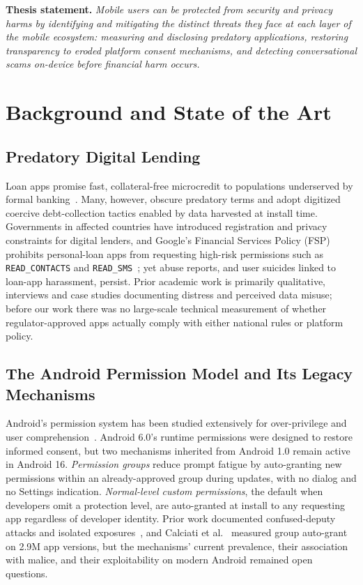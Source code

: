 \documentclass[letterpaper,11pt]{article}
\begin{document}
\textbf{Thesis statement.} \emph{Mobile users can be protected from
security and privacy harms by identifying and mitigating the distinct
threats they face at each layer of the mobile ecosystem: measuring and
disclosing predatory applications, restoring transparency to eroded
platform consent mechanisms, and detecting conversational scams
on-device before financial harm occurs.}

\section{Background and State of the Art}
\label{sec:background}

\subsection{Predatory Digital Lending}
Loan apps promise fast, collateral-free microcredit to populations
underserved by formal banking~\cite{suri2016mpesa}. Many, however,
obscure predatory terms and adopt digitized coercive debt-collection
tactics enabled by data harvested at install time. Governments in
affected countries have introduced registration and privacy
constraints for digital lenders, and Google's Financial Services
Policy (FSP) prohibits personal-loan apps from requesting high-risk
permissions such as \texttt{READ\_CONTACTS} and
\texttt{READ\_SMS}~\cite{googlefsp}; yet abuse reports, and user
suicides linked to loan-app harassment, persist. Prior academic work
is primarily qualitative, interviews and case studies documenting
distress and perceived data misuse; before our work there was no
large-scale technical measurement of whether regulator-approved apps
actually comply with either national rules or platform policy.

\subsection{The Android Permission Model and Its Legacy Mechanisms}
Android's permission system has been studied extensively for
over-privilege and user
comprehension~\cite{felt2011demystified,felt2012attention,wijesekera2015remystified}.
Android 6.0's runtime permissions were designed to restore informed
consent, but two mechanisms inherited from Android 1.0 remain active
in Android 16. \emph{Permission groups} reduce prompt fatigue by
auto-granting new permissions within an already-approved group during
updates, with no dialog and no Settings indication. \emph{Normal-level
custom permissions}, the default when developers omit a protection
level, are auto-granted at install to any requesting app regardless of
developer identity. Prior work documented confused-deputy attacks and
isolated exposures~\cite{tuncay2018custom,gamba2020preinstalled}, and
Calciati et al.~\cite{calciati2020automatically} measured group
auto-grant on 2.9M app versions, but the mechanisms' current
prevalence, their association with malice, and their exploitability on
modern Android remained open questions.
\end{document}

